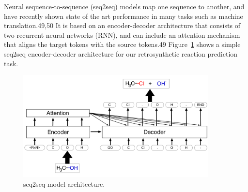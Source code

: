 Neural sequence-to-sequence (seq2seq) models map one sequence to another, and have recently shown state of the art performance in many tasks such as machine translation.49,50 It is based on an encoder-decoder architecture that consists of two recurrent neural networks (RNN), and can include an attention mechanism that aligns the target tokens with the source tokens.49 Figure~\ref{fig:ret_seq2seq} shows a simple seq2seq encoder-decoder architecture for our retrosynthetic reaction prediction task.

\begin{figure}
  \centering
  \includegraphics[width=0.9\textwidth]{Images/ret_seq2seq.png}
  \caption{seq2seq model architecture.}
  \label{fig:ret_seq2seq}
\end{figure}

